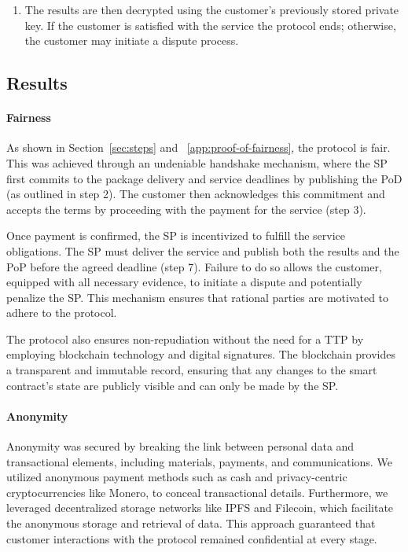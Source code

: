 \documentclass[pdftex,twocolumn,epjc3]{svjour3}
\begin{document}
{\begin{enumerate}
  \item The results are then decrypted using the customer's previously stored private key. If the customer is satisfied with the service the protocol ends; otherwise, the customer may initiate a dispute process.
  
\end{enumerate}

\subsection{Results}

\paragraph{Fairness}
As shown in Section~\ref{sec:steps} and ~\ref{app:proof-of-fairness}, the protocol is fair. This was achieved through an undeniable handshake mechanism, where the SP first commits to the package delivery and service deadlines by publishing the PoD (as outlined in step 2). The customer then acknowledges this commitment and accepts the terms by proceeding with the payment for the service (step 3).

Once payment is confirmed, the SP is incentivized to fulfill the service obligations. The SP must deliver the service and publish both the results and the PoP before the agreed deadline (step 7). Failure to do so allows the customer, equipped with all necessary evidence, to initiate a dispute and potentially penalize the SP. This mechanism ensures that rational parties are motivated to adhere to the protocol.

The protocol also ensures non-repudiation without the need for a TTP by employing blockchain technology and digital signatures. The blockchain provides a transparent and immutable record, ensuring that any changes to the smart contract's state are publicly visible and can only be made by the SP.


\paragraph{Anonymity}
Anonymity was secured by breaking the link between personal data and transactional elements, including materials, payments, and communications. We utilized anonymous payment methods such as cash and privacy-centric cryptocurrencies like Monero, to conceal transactional details. Furthermore, we leveraged decentralized storage networks like IPFS and Filecoin, which facilitate the anonymous storage and retrieval of data. This approach guaranteed that customer interactions with the protocol remained confidential at every stage.

}
\end{document}
